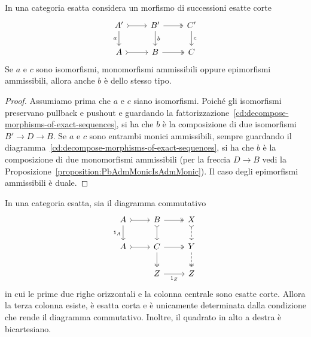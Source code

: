 \begin{corollary}
  \label{cor:five-lemma}
  In una categoria esatta considera un morfismo di successioni esatte corte
  \[
    \begin{tikzcd}
      A' \ar["{a}", d, swap] \ar["{}", rightarrowtail, r] & B' \ar["{b}", d] \ar["{}", twoheadrightarrow, r] & C' \ar["{c}", d] \\
      A \ar["{}", rightarrowtail, r] & B \ar["{}", twoheadrightarrow, r] & C
    \end{tikzcd}
  \]
  Se \(a\) e \(c\) sono isomorfismi, monomorfismi ammissibili oppure epimorfismi
  ammissibili, allora anche \(b\) è dello stesso tipo.
\end{corollary}

\begin{proof}
  Assumiamo prima che \(a\) e \(c\) siano isomorfismi. Poiché gli
  isomorfismi preservano pullback e pushout e guardando la
  fattorizzazione~\eqref{cd:decompose-morphisms-of-exact-sequences}, si
  ha che \(b\) è la composizione di due isomorfismi \(B' \to D \to B\). Se
  \(a\) e \(c\) sono entrambi monici ammissibili, sempre guardando il
  diagramma~\eqref{cd:decompose-morphisms-of-exact-sequences}, si ha che
  \(b\) è la composizione di due monomorfismi ammissibili (per la
  freccia \(D \to B\) vedi la
  Proposizione~\ref{proposition:PbAdmMonicIsAdmMonic}). Il caso degli
  epimorfismi ammissibili è duale.
\end{proof}

\begin{lemma}
  \label{lem:c/b=(c/a)/(b/a)}
  In una categoria esatta, sia il diagramma commutativo
  \[
    \begin{tikzcd}
      A \ar["{\id_A}", d, swap] \ar["{}", rightarrowtail, r] & B
      \ar["{}", rightarrowtail, d] \ar["{}", twoheadrightarrow, r] & X
      \ar["{}", dashed, rightarrowtail, d] \\
      A \ar["{}", rightarrowtail, r] & C \ar["{}", twoheadrightarrow, d]
      \ar["{}", twoheadrightarrow, r] & Y \ar["{}", dashed, twoheadrightarrow, d] \\
      & Z \ar["{\id_Z}", r, swap] & Z
    \end{tikzcd}
  \]
  in cui le prime due righe orizzontali e la colonna centrale sono
  esatte corte. Allora la terza colonna esiste, è esatta corta e è
  unicamente determinata dalla condizione che rende il diagramma
  commutativo. Inoltre, il quadrato in alto a destra è bicartesiano.
\end{lemma}

